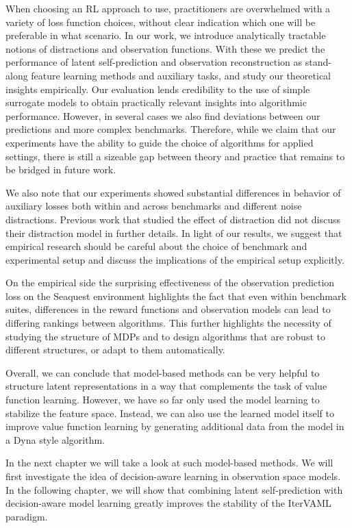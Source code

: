 When choosing an RL approach to use, practitioners are overwhelmed with a variety of loss function choices, without clear indication which one will be preferable in what scenario.
In our work, we introduce analytically tractable notions of distractions and observation functions.
With these we predict the performance of latent self-prediction and observation reconstruction as stand-along feature learning methods and auxiliary tasks, and study our theoretical insights empirically.
Our evaluation lends credibility to the use of simple surrogate models to obtain practically relevant insights into algorithmic performance.
However, in several cases we also find deviations between our predictions and more complex benchmarks.
Therefore, while we claim that our experiments have the ability to guide the choice of algorithms for applied settings, there is still a sizeable gap between theory and practice that remains to be bridged in future work.

We also note that our experiments showed substantial differences in behavior of auxiliary losses both within and across benchmarks and different noise distractions.
Previous work that studied the effect of distraction \parencite{nikishin2021control,voelcker2022value,ni2024bridging} did not discuss their distraction model in further details. 
In light of our results, we suggest that empirical research should be careful about the choice of benchmark and experimental setup and discuss the implications of the empirical setup explicitly.

On the empirical side the surprising effectiveness of the observation prediction loss on the Seaquest environment highlights the fact that even within benchmark suites, differences in the reward functions and observation models can lead to differing rankings between algorithms.
This further highlights the necessity of studying the structure of MDPs and to design algorithms that are robust to different structures, or adapt to them automatically.

Overall, we can conclude that model-based methods can be very helpful to structure latent representations in a way that complements the task of value function learning.
However, we have so far only used the model learning to stabilize the feature space.
Instead, we can also use the learned model itself to improve value function learning by generating additional data from the model in a Dyna style algorithm.

In the next chapter we will take a look at such model-based methods.
We will first investigate the idea of decision-aware learning in observation space models.
In the following chapter, we will show that combining latent self-prediction with decision-aware model learning greatly improves the stability of the IterVAML paradigm.